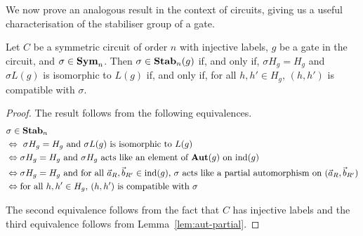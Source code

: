 \documentclass[../paper.tex]{subfiles}
\begin{document}
We now prove an analogous result in the context of circuits, giving us a useful
characterisation of the stabiliser group of a gate.

\begin{lem}
  Let $C$ be a symmetric circuit of order $n$ with injective labels, $g$ be a
  gate in the circuit, and $\sigma \in \text{\textbf{Sym}}_n$. Then $\sigma \in \text{\textbf{Stab}}_n(g)$ if,
  and only if, $\sigma H_g = H_g$ and $\sigma L(g)$ is isomorphic to $L(g)$ if,
  and only if, for all $h, h' \in H_g$, $(h, h')$ is compatible with $\sigma$.
  \label{lem:isostab-compatible}
\end{lem}

\begin{proof}
  The result follows from the following equivalences.
  \begin{align*}
    & \sigma \in \text{\textbf{Stab}}_n\\
    & \Leftrightarrow \text{ $\sigma H_g = H_g$ and $\sigma L(g)$ is
      isomorphic to $L(g)$}\\
    & \Leftrightarrow \text{$\sigma H_g = H_g$ and $\sigma H_g$ acts like an
      element of $\text{\textbf{Aut}} (g)$ on $\text{\upshape ind}(g)$} \\
    & \Leftrightarrow \text{$\sigma H_g = H_g$ and for all $\vec{a}_R,
      \vec{b}_{R'} \in \text{\upshape ind}(g)$, $\sigma$ acts like a partial automorphism on
      $(\vec{a}_R, \vec{b}_{R'})$}\\
    & \Leftrightarrow \text{for all $h, h' \in H_g$, $(h, h')$ is compatible with
      $\sigma$}
  \end{align*}


  The second equivalence follows from the fact that $C$ has injective labels and
  the third equivalence follows from Lemma~\ref{lem:aut-partial}.

\end{proof}
\end{document}
